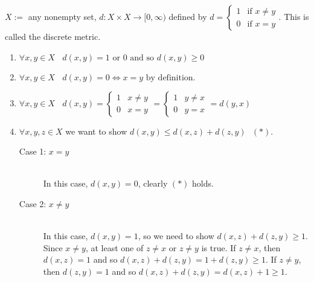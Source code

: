 \begin{example}
    $X:=$ any nonempty set, $d:X \times X \rightarrow [0, \infty)$ defined by $d=\begin{cases} 1 &\text{if } x\not=y \\ 0 &\text{if } x=y\end{cases}$. This is called the discrete metric.

    \begin{enumerate}[$(i)$]
        \item $\forall x,y \in X ~~~~ d(x,y) =1 \text{ or } 0 \text{ and so } d(x,y) \geq 0$
        \item $\forall x,y \in X ~~~~d(x,y) = 0 \iff x=y \text{ by definition.}$
        \item $\forall x,y \in X ~~~~d(x,y) =
        \begin{cases}
            1 &x \not = y \\ 0 &x=y
        \end{cases} =
        \begin{cases}
            1 &y \not = x \\ 0 & y = x
        \end{cases} = d(y,x)$
        \item $\forall x,y,z \in X$ we want to show $d(x,y) \leq d(x,z) + d(z,y) ~~~ (*)$.
        \begin{description}
            \item[Case 1: $x=y$] \leavevmode \\
            In this case, $d(x,y) = 0$, clearly  $(*)$ holds.
            \item[Case 2: $x \not = y$] \leavevmode \\
            In this case, $d(x,y) = 1$, so we need to show $d(x,z) + d(z,y) \geq 1$. Since  $x \not = y$, at least one of $z \not = x$ or $z \not = y$ is true.
            If $z \not = x$, then $d(x,z) = 1$ and so $d(x,z) + d(z, y) = 1 + d(z,y) \geq 1$.
            If $z \not = y$, then $d(z,y) = 1$ and so $d(x,z) + d(z,y) = d(x,z) + 1 \geq 1$.
        \end{description}
    \end{enumerate}
\end{example}

